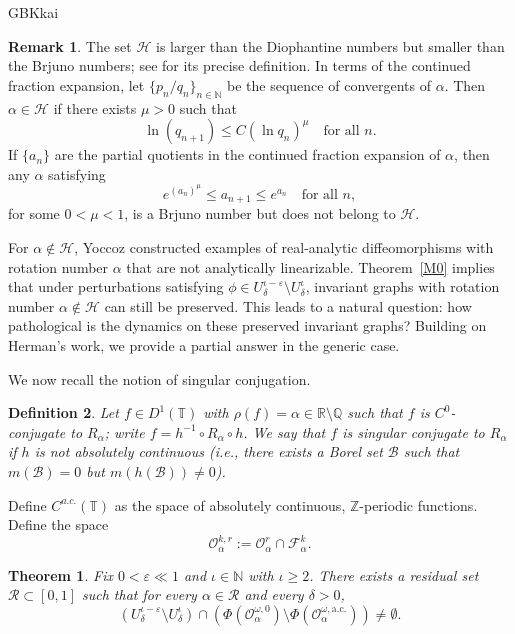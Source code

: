 \documentclass{amsart}
\newtheorem{Theorem}{Theorem}
\newtheorem{Definition}{Definition}[section]
\theoremstyle{definition}
\newtheorem{Remark}[Definition]{Remark}
\begin{document}
\begin{CJK*}{GBK}{kai}
\begin{Remark}\label{hbdd}
The set \(\mathcal{H}\) is larger than the Diophantine numbers but smaller than the Brjuno numbers; see \cite{Y3} for its precise definition. In terms of the continued fraction expansion, let \(\{p_n / q_n\}_{n \in \mathbb{N}}\) be the sequence of convergents of \(\alpha\). Then \(\alpha \in \mathcal{H}\) if there exists \(\mu > 0\) such that
\[
\ln(q_{n+1}) \leq C (\ln q_n)^\mu \quad \text{for all } n.
\]
If \(\{a_n\}\) are the partial quotients in the continued fraction expansion of \(\alpha\), then any \(\alpha\) satisfying
\[
e^{(a_n)^\mu} \leq a_{n+1} \leq e^{a_n} \quad \text{for all } n,
\]
for some \(0 < \mu < 1\), is a Brjuno number but does not belong to \(\mathcal{H}\).
\end{Remark}
For \(\alpha \notin \mathcal{H}\), Yoccoz constructed examples of real-analytic diffeomorphisms with rotation number \(\alpha\) that are not analytically linearizable. Theorem~\ref{M0} implies that under perturbations satisfying \(\phi \in U_\delta^{\iota - \varepsilon} \setminus U_\delta^\iota\), invariant graphs with rotation number \(\alpha \notin \mathcal{H}\) can still be preserved. This leads to a natural question: how pathological is the dynamics on these preserved invariant graphs? Building on Herman's work, we provide a partial answer in the generic case.

We now recall the notion of singular conjugation.
\begin{Definition}
Let \( f \in D^1(\mathbb{T}) \) with \( \rho(f) = \alpha \in \mathbb{R} \setminus \mathbb{Q} \) such that \( f \) is \( C^0 \)-conjugate to \( R_\alpha \); write \( f = h^{-1} \circ R_\alpha \circ h \). We say that \( f \) is singular conjugate to \( R_\alpha \) if \( h \) is not absolutely continuous (i.e., there exists a Borel set \( \mathcal{B} \) such that \( m(\mathcal{B}) = 0 \) but \( m(h(\mathcal{B})) \neq 0 \)).
\end{Definition}

Define \( C^{a.c.}(\mathbb{T}) \) as the space of absolutely continuous, \(\mathbb{Z}\)-periodic functions.
Define the space
\[
\mathcal{O}_\alpha^{k,r} := \mathcal{O}_\alpha^r \cap \mathcal{F}_\alpha^k.
\]

\begin{Theorem}\label{M01}
Fix \( 0 < \varepsilon \ll 1 \) and $\iota \in \mathbb{N}$ with $\iota \geq 2$. There exists a residual set \( \mathcal{R} \subset [0,1] \) such that for every \( \alpha \in \mathcal{R} \) and every \( \delta > 0 \),
\[
\left(U_\delta^{\iota - \varepsilon} \setminus U_\delta^\iota\right) \cap \left(\Phi(\mathcal{O}_\alpha^{\omega,0}) \setminus \Phi(\mathcal{O}_\alpha^{\omega,\mathrm{a.c.}})\right) \neq \emptyset.
\]
\end{Theorem}


\end{CJK*}
\end{document}
